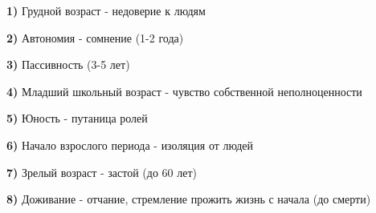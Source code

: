 \documentclass{article}
\begin{document}
\begin{flushleft}
\begin{minipage}[t]{0.48\textwidth}
\bigskip

\textbf{1) } Грудной возраст - недоверие к людям

\textbf{2) } Автономия - сомнение (1-2 года)

\textbf{3) } Пассивность (3-5 лет)

\textbf{4) } Младший школьный возраст - чувство собственной неполноценности

\textbf{5) } Юность - путаница ролей

\textbf{6) } Начало взрослого периода - изоляция от людей

\textbf{7) } Зрелый возраст - застой (до 60 лет)

\textbf{8) } Доживание - отчание, стремление прожить жизнь с начала (до смерти)
\end{minipage}

\end{flushleft}
\end{document}
